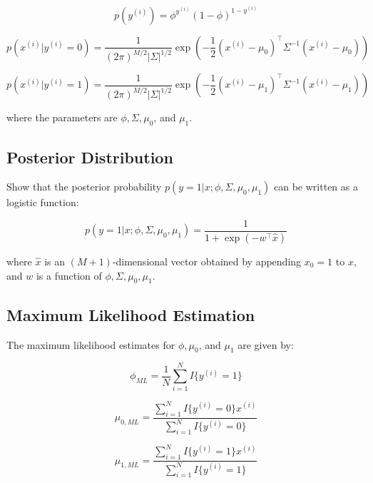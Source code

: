 \documentclass[lang=cn,11pt]{elegantbook}
\begin{document}
\begin{equation}
    p(y^{(i)}) = \phi^{y^{(i)}} (1 - \phi)^{1 - y^{(i)}}
\end{equation}

\begin{equation}
    p(x^{(i)}|y^{(i)}=0) = \frac{1}{(2\pi)^{M/2} |\Sigma|^{1/2}} \exp\left(-\frac{1}{2} (x^{(i)} - \mu_0)^\top \Sigma^{-1} (x^{(i)} - \mu_0)\right)
\end{equation}

\begin{equation}
    p(x^{(i)}|y^{(i)}=1) = \frac{1}{(2\pi)^{M/2} |\Sigma|^{1/2}} \exp\left(-\frac{1}{2} (x^{(i)} - \mu_1)^\top \Sigma^{-1} (x^{(i)} - \mu_1)\right)
\end{equation}

where the parameters are $\phi, \Sigma, \mu_0$, and $\mu_1$.

\subsection{Posterior Distribution}

Show that the posterior probability $p(y=1|x;\phi,\Sigma,\mu_0,\mu_1)$ can be written as a logistic function:

\begin{equation}
    p(y=1|x;\phi,\Sigma,\mu_0,\mu_1) = \frac{1}{1 + \exp(-w^\top \hat{x})}
\end{equation}

where $\hat{x}$ is an $(M+1)$-dimensional vector obtained by appending $x_0=1$ to $x$, and $w$ is a function of $\phi,\Sigma,\mu_0,\mu_1$.

\subsection{Maximum Likelihood Estimation}

The maximum likelihood estimates for $\phi, \mu_0$, and $\mu_1$ are given by:

\begin{equation}
    \phi_{ML} = \frac{1}{N} \sum_{i=1}^{N} I\{y^{(i)} = 1\}
\end{equation}

\begin{equation}
    \mu_{0,ML} = \frac{\sum_{i=1}^{N} I\{y^{(i)} = 0\} x^{(i)}}{\sum_{i=1}^{N} I\{y^{(i)} = 0\}}
\end{equation}

\begin{equation}
    \mu_{1,ML} = \frac{\sum_{i=1}^{N} I\{y^{(i)} = 1\} x^{(i)}}{\sum_{i=1}^{N} I\{y^{(i)} = 1\}}
\end{equation}
\end{document}
